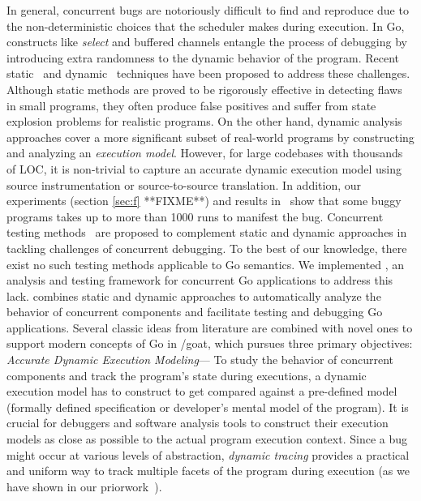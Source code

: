 In general, concurrent bugs are notoriously difficult to find and reproduce due to the non-deterministic choices that the scheduler makes during execution.
%
In Go, constructs like \textit{select} and buffered channels entangle the process of debugging by introducing extra randomness to the dynamic behavior of the program.
%
Recent static~\cite{ng-dl-cc16,stadtmuller-minigo-aplas16,lange-fence-popl17,lange-staticType-icse18} and dynamic~\cite{go-race-blog,zhao-occam97,sulzmann-corr17,sulzmann-twophase-2018,dilley-gomela-corr2020} techniques have been proposed to address these challenges.
%
Although static methods are proved to be rigorously effective in detecting flaws in small programs, they often produce false positives and suffer from state explosion problems for realistic programs.
%
On the other hand, dynamic analysis approaches cover a more significant subset of real-world programs by constructing and analyzing an \textit{execution model}.
%
However, for large codebases with thousands of LOC, it is non-trivial to capture an accurate dynamic execution model using source instrumentation or source-to-source translation.
%
In addition, our experiments (section \ref{sec:f} **FIXME**) and results in~\cite{yuan-gobench-cgo21} show that some buggy programs takes up to more than 1000 runs to manifest the bug.
%
Concurrent testing methods~\cite{arora-concrrentTesting-16} are proposed to complement static and dynamic approaches in tackling challenges of concurrent debugging.
%
To the best of our knowledge, there exist no such testing methods applicable to Go semantics.
%
We implemented \goat, an analysis and testing framework for concurrent Go applications to address this lack.
%
\goat combines static and dynamic approaches to automatically analyze the behavior of concurrent components and facilitate testing and debugging Go applications.
%
Several classic ideas from literature are combined with novel ones to support modern concepts of Go in /goat, which pursues three primary objectives:
\\
 \textit{Accurate Dynamic Execution Modeling}---
To study the behavior of concurrent components and track the program's state during executions, a dynamic execution model has to construct to get compared against a pre-defined model (\eg formally defined specification or developer's mental model of the program).
%
It is crucial for debuggers and software analysis tools to construct their execution models as close as possible to the actual program execution context.
%
Since a bug might occur at various levels of abstraction, \textit{dynamic tracing} provides a practical and uniform way to track multiple facets of the program during execution (as we have shown in our priorwork~\cite{difftrace}).
